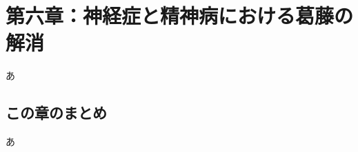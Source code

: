\section{第六章：神経症と精神病における葛藤の解消}\label{ux7b2cux516dux7ae0ux795eux7d4cux75c7ux3068ux7cbeux795eux75c5ux306bux304aux3051ux308bux845bux85e4ux306eux89e3ux6d88}

あ

\subsection{この章のまとめ}\label{ux3053ux306eux7ae0ux306eux307eux3068ux3081}

あ
